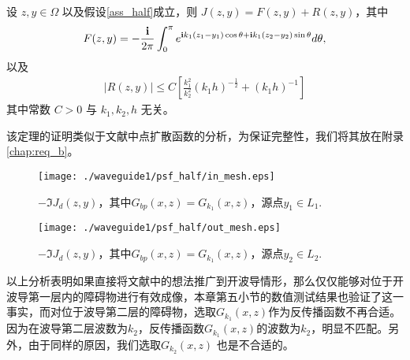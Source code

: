 \begin{theorem}\label{thm_psf_half}
设 $z,y\in\Omega$ 以及假设\ref{ass_half}成立，则 $J(z,y)=F(z,y)+R(z,y)$，其中
\begin{eqnarray}
F(z,y)=-\frac{\mathbf{i}}{2\pi}\int_0^{\pi}e^{\mathbf{i} k_1(z_1-y_1)\cos\theta+\mathbf{i} k_1(z_2-y_2)\sin\theta}d\theta,
\end{eqnarray}
以及
\begin{eqnarray*}
|R(z,y)|\leq C\left[\frac{k_1^2}{k_2^2}(k_1h)^{-\frac{1}{2}}+(k_1h)^{-1}\right]
\end{eqnarray*}
其中常数 $C>0$ 与 $k_1,k_2,h$ 无关。
\end{theorem}
\debproof
该定理的证明类似于文献\cite{ch_ha,ch_cw}中点扩散函数的分析，为保证完整性，我们将其放在附录\ref{chap:req_b}。
\finproof

\begin{figure}[h]
  \centering
  \texttt{[image: ./waveguide1/psf\_half/in\_mesh.eps]}
  \caption{$-\Im J_d(z,y)$，其中$G_{bp}(x,z)=G_{k_1}(x,z)$，源点$y_1\in L_1$.}\label{ImagPSF_half1}
\end{figure}
\begin{figure}[h]
  \centering
  \texttt{[image: ./waveguide1/psf\_half/out\_mesh.eps]}
  \caption{$-\Im J_d(z,y)$，其中$G_{bp}(x,z)=G_{k_1}(x,z)$，源点$y_2\in L_2$.}\label{ImagPSF_half2}
\end{figure}


以上分析表明如果直接将文献\cite{ch_cw,ch_ha}中的想法推广到开波导情形，那么仅仅能够对位于开波导第一层内的障碍物进行有效成像，本章第五小节的数值测试结果也验证了这一事实，而对位于波导第二层的障碍物，选取$G_{k_1}(x,z)$作为反传播函数不再合适。因为在波导第二层波数为$k_2$，反传播函数$G_{k_1}(x,z)$的波数为$k_2$，明显不匹配。另外，由于同样的原因，我们选取$G_{k_2}(x,z)$ 也是不合适的。

